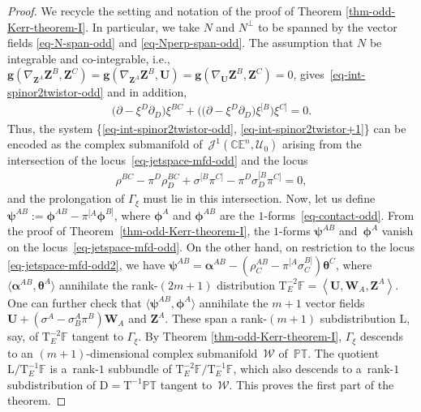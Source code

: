 \documentclass[10pt,a4paper]{amsart}
\numberwithin{equation}{section}
\newcommand{\mc} [1]{\mathcal{#1}}
\newcommand{\Drm} {{\mathrm{D}}}
\newcommand{\Tgt} {\mathrm{T}}
\newcommand{\PT} {\mathbb{PT}}
\newcommand{\E} {\mathbb{E}}
\newcommand{\C} {\mathbb{C}}
\newcommand{\F} {\mathbb{F}}
\begin{document}
\begin{proof}We recycle the setting and notation of the proof of Theorem \ref{thm-odd-Kerr-theorem-I}. In particular, we take $N$ and $N^\perp$ to be spanned by the vector f\/ields \eqref{eq-N-span-odd} and \eqref{eq-Nperp-span-odd}. The assumption that $N$ be integrable and co-integrable, i.e., $\bm{g} ( \nabla_{\bm{Z}^{A}} \bm{Z}^{B} , \bm{Z}^{C} ) = \bm{g} ( \nabla_{\bm{Z}^{A}} \bm{Z}^{B} , \bm{U} ) = \bm{g} ( \nabla_{\bm{U}} \bm{Z}^{B} , \bm{Z}^{C} ) =0$, gives~\eqref{eq-int-spinor2twistor-odd} and in addition,
\begin{gather}\label{eq-int-spinor2twistor+1}
\big( \partial - \xi^{D} \partial _{D} \big) \xi^{BC} + \big( \big( \partial - \xi^{D} \partial _{D} \big) \xi^{[B} \big) \xi^{C]} = 0 .
\end{gather}
Thus, the system \{\eqref{eq-int-spinor2twistor-odd}, \eqref{eq-int-spinor2twistor+1}\} can be encoded as the complex submanifold of~$\mc{J}^1(\C \E^n, \mc{U}_0)$ arising from the intersection of the locus~\eqref{eq-jetspace-mfd-odd} and the locus
\begin{gather}\label{eq-jetspace-mfd-odd2}
\rho^{BC} - \pi^{D} \rho_{D}^{BC} + \sigma^{[B} \pi^{C]} - \pi^{D} \sigma_{D}^{[B} \pi^{C]} = 0 ,
\end{gather}
and the prolongation of $\Gamma_\xi$ must lie in this intersection. Now, let us def\/ine $\bm{\psi}^{AB} := \bm{\phi}^{AB} - \pi^{[A} \bm{\phi}^{B]}$, where $\bm{\phi}^A$ and $\bm{\phi}^{AB}$ are the $1$-forms~\eqref{eq-contact-odd}. From the proof of Theorem~\ref{thm-odd-Kerr-theorem-I}, the $1$-forms $\bm{\psi}^{AB}$ and~$\bm{\phi}^A$ vanish on the locus~\eqref{eq-jetspace-mfd-odd}. On the other hand, on restriction to the locus \eqref{eq-jetspace-mfd-odd2}, we have $\bm{\psi}^{AB} = \bm{\alpha}^{AB} - \left( \rho_{C}^{AB} - \pi^{[A} \sigma_{C}^{B]} \right) \bm{\theta}^C$, where $\langle \bm{\alpha}^{AB}, \bm{\theta}^A \rangle$ annihilate the rank-$(2m+1)$ distribution $\Tgt^{-2}_E \F = \left\langle \bm{U} , \bm{W}_A , \bm{Z}^A \right\rangle$. One can further check that $\langle \bm{\psi}^{AB} , \bm{\phi}^A \rangle$ annihilate the $m+1$ vector f\/ields $\bm{U} + \left( \sigma^A - \sigma_B^A \pi^B \right) \bm{W}_A$ and $\bm{Z}^A$. These span a rank-$(m+1)$ subdistribution $\mathrm{L}$, say, of $\Tgt^{-2}_E \F$ tangent to $\Gamma_\xi$. By Theorem \ref{thm-odd-Kerr-theorem-I}, $\Gamma_\xi$ descends to an $(m+1)$-dimensional complex submanifold~$\mc{W}$ of~$\PT$. The quotient $\mathrm{L}/\Tgt^{-1}_E \F$ is a~rank-$1$ subbundle of $\Tgt^{-2}_E \F/\Tgt^{-1}_E \F$, which also descends to a~rank-$1$ subdistribution of $\Drm = \Tgt^{-1} \PT$ tangent to~$\mc{W}$. This proves the f\/irst part of the theorem.


\end{proof}
\end{document}
